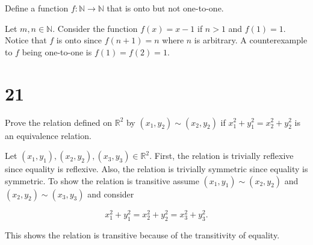 \documentclass[a4paper]{article}
\begin{document}
\vspace{\baselineskip}

Define a function $f: \mathbb{N} \rightarrow \mathbb{N}$ that is onto but not one-to-one.

\vspace{\baselineskip}

Let $m,n \in \mathbb{N}$. Consider the function $f(x) = x - 1$ if $n > 1$ and $f(1) = 1$. Notice that $f$ is onto since $f(n+1) = n$ where $n$ is arbitrary. A counterexample to $f$ being one-to-one is $f(1) = f(2) = 1$.


\section*{21}

Prove the relation defined on $\mathbb{R}^2$ by $(x_1, y_2) \sim (x_2, y_2)$ if $x_1^2 + y_1^2 = x_2^2 + y_2^2$ is an equivalence relation.

\vspace{\baselineskip}

Let $(x_1, y_1), (x_2, y_2), (x_3, y_3) \in \mathbb{R}^2$. First, the relation is trivially reflexive since equality is reflexive. Also, the relation is trivially symmetric since equality is symmetric. To show the relation is transitive assume $(x_1, y_1) \sim (x_2, y_2)$ and $(x_2, y_2) \sim (x_3, y_3)$ and consider

$$x_1^2 + y_1 ^2 = x_2^2 + y_2^2 = x_3^2 + y_3^2.$$

This shows the relation is transitive because of the transitivity of equality.
\end{document}
